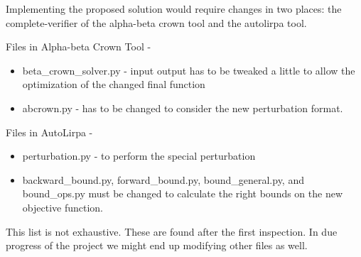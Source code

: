 \documentclass{article}
\begin{document}
Implementing the proposed solution would require changes in two places: the complete-verifier of the alpha-beta crown tool and the autolirpa tool.

Files in Alpha-beta Crown Tool - 

\begin{itemize}
    \item beta\_crown\_solver.py - input output has to be tweaked a little to allow the optimization of the changed final function
    \item abcrown.py - has to be changed to consider the new perturbation format.
\end{itemize}

Files in AutoLirpa - 

\begin{itemize}
    \item perturbation.py - to perform the special perturbation
    \item backward\_bound.py, forward\_bound.py, bound\_general.py, and bound\_ops.py must be changed to calculate the right bounds on the new objective function.
\end{itemize}

This list is not exhaustive. These are found after the first inspection. In due progress of the project we might
end up modifying other files as well.
\end{document}
